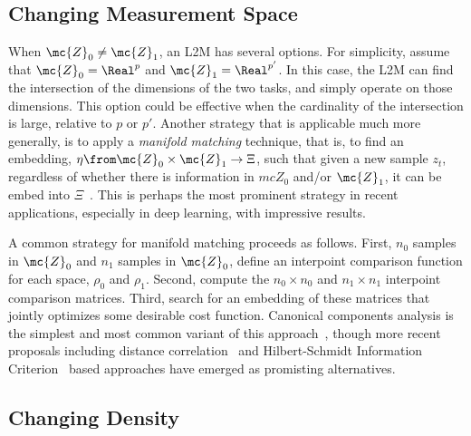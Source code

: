 \documentclass{article}
\begin{document}

\subsection{Changing Measurement Space}

When $\mc{Z}_0 \neq \mc{Z}_1$, an L2M has several options. For simplicity, assume that $\mc{Z}_0 = \Real^p$ and $\mc{Z}_1 = \Real^{p'}$.  In this case, the L2M can find the intersection of the dimensions of the two tasks, and simply operate on those dimensions.  This option could be effective when the cardinality of the intersection is large, relative to $p$ or $p'$.  Another strategy that is applicable much more generally,  is to apply a \emph{manifold matching} technique, that is, to find an embedding, $\eta \from \mc{Z}_0 \times \mc{Z}_1 \to \Xi$, such that given a new sample $z_t$, regardless of whether there is information in $mc{Z}_0$ and/or $\mc{Z}_1$, it can be embed into $\Xi$~\cite{manifold_matching}.  This is perhaps the most prominent strategy in recent applications, especially in deep learning, with impressive results.  


A common strategy for manifold matching proceeds as follows.  First, $n_0$ samples in $\mc{Z}_0$ and $n_1$ samples in $\mc{Z}_0$, define an interpoint comparison function for each space, $\rho_0$ and $\rho_1$.  Second, compute the $n_0 \times n_0$ and $n_1 \times n_1$ interpoint comparison matrices.  Third, search for an embedding of these matrices that jointly optimizes some desirable cost function.  Canonical components analysis is the simplest and most common variant of this approach~\cite{cca}, though more recent proposals including distance correlation~\cite{dcorrca} and Hilbert-Schmidt Information Criterion~\cite{hsic_ca} based approaches have emerged as promisting alternatives. 

\subsection{Changing Density}
\end{document}
